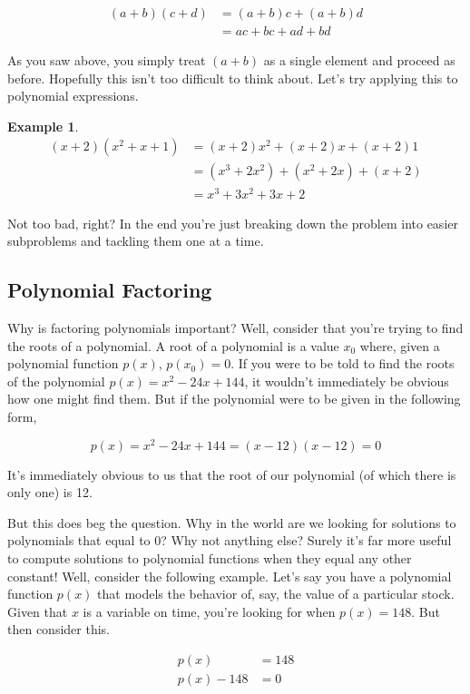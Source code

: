 \documentclass{scrbook}
\theoremstyle{definition}
\newtheorem{example}{Example}
\begin{document}
\begin{align*}
  (a + b)(c + d) &= (a + b)c + (a + b)d\\
  &= ac + bc + ad + bd
\end{align*}

As you saw above, you simply treat $(a + b)$ as a single element and proceed as before. Hopefully this isn't too difficult to think about. Let's try applying this to polynomial expressions.

\begin{example}
\begin{align*}
  (x + 2)(x^2 + x + 1) &= (x + 2)x^2 + (x+2)x + (x+2)1\\
  &= (x^3 + 2x^2) + (x^2 + 2x) + (x+2)\\
  &= x^3 + 3x^2 + 3x + 2
\end{align*}
\end{example}

Not too bad, right? In the end you're just breaking down the problem into easier subproblems and tackling them one at a time. 

\subsection{Polynomial Factoring}

Why is factoring polynomials important? Well, consider that you're trying to find the roots of a polynomial. A root of a polynomial is a value $x_0$ where, given a polynomial function $p(x)$, $p(x_0) = 0$. If you were to be told to find the roots of the polynomial $p(x) = x^2 - 24x + 144$, it wouldn't immediately be obvious how one might find them. But if the polynomial were to be given in the following form,

\[
  p(x) = x^2 -24x + 144 = (x - 12)(x - 12) = 0
\]

It's immediately obvious to us that the root of our polynomial (of which there is only one) is 12. 

But this does beg the question. Why in the world are we looking for solutions to polynomials that equal to 0? Why not anything else? Surely it's far more useful to compute solutions to polynomial functions when they equal any other constant! Well, consider the following example. Let's say you have a polynomial function $p(x)$ that models the behavior of, say, the value of a particular stock. Given that $x$ is a variable on time, you're looking for when $p(x) = 148$. But then consider this.

\begin{align*}
  p(x) &= 148\\
  p(x) - 148 &= 0
\end{align*}
\end{document}
